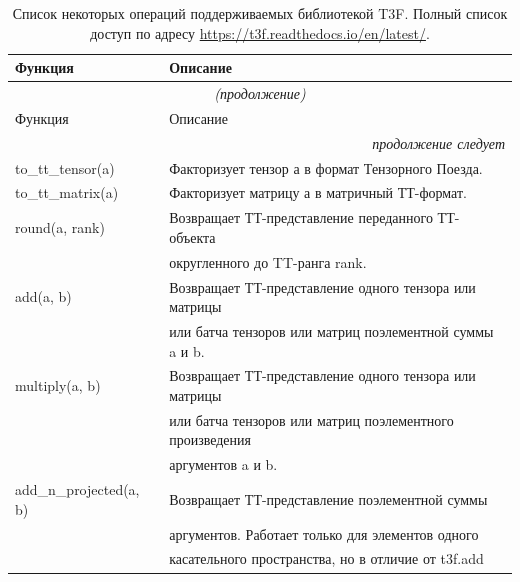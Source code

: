 \begin{longtable}[c]{ll} %
 \caption{Список некоторых операций поддерживаемых библиотекой T3F. Полный список доступ по адресу \url{https://t3f.readthedocs.io/en/latest/}.}\label{tbl:t3f-ops}\\
 \hline
 Функция & Описание               \\ \hline
                                              \endfirsthead   \hline
 \multicolumn{2}{|c|}{\small\slshape (продолжение)}        \\ \hline
 Функция & Описание               \\ \hline
                                              \endhead        \hline
 \multicolumn{2}{|r|}{\small\slshape продолжение следует}  \\ \hline
                                              \endfoot        \hline
                                              \endlastfoot
to\_tt\_tensor(a) & Факторизует тензор а в формат Тензорного Поезда.\\
to\_tt\_matrix(a) & Факторизует матрицу а в матричный ТТ-формат.\\
round(a, rank) & Возвращает ТТ-представление переданного ТТ-объекта\\
&  округленного до TT-ранга rank.\\
add(a, b) & Возвращает ТТ-представление одного тензора или матрицы\\
&  или батча тензоров или матриц поэлементной суммы a и b.\\
multiply(a, b) & Возвращает ТТ-представление одного тензора или матрицы \\
 & или батча тензоров или матриц поэлементного произведения \\
 & аргументов a и b.\\
add\_n\_projected(a, b) & Возвращает ТТ-представление поэлементной суммы\\
 & аргументов. Работает только для элементов одного\\
 & касательного пространства, но в отличие от t3f.add\\

\end{longtable}
